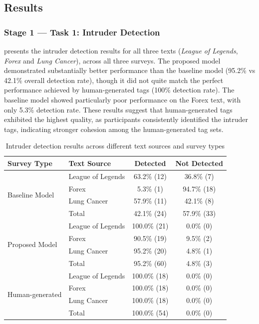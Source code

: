 
\subsection{Results}
\subsubsection{Stage 1 — Task 1: Intruder Detection}
 presents the intruder detection results for all three texts (\textit{League of Legends}, \textit{Forex} and \textit{Lung Cancer}), across all three surveys. The proposed model demonstrated substantially better performance than the baseline model (95.2\% vs 42.1\% overall detection rate), though it did not quite match the perfect performance achieved by human-generated tags (100\% detection rate). The baseline model showed particularly poor performance on the Forex text, with only 5.3\% detection rate. These results suggest that human-generated tags exhibited the highest quality, as participants consistently identified the intruder tags, indicating stronger cohesion among the human-generated tag sets.

\begin{table}[h]
    \centering
    \caption{Intruder detection results across different text sources and survey types}
    \begin{tabular}{llcc}
        \hline
        Survey Type & Text Source & Detected & Not Detected \\
        \hline
        \multirow{4}{*}{Baseline Model} & League of Legends & 63.2\% (12) & 36.8\% (7) \\
        & Forex & 5.3\% (1) & 94.7\% (18) \\
        & Lung Cancer & 57.9\% (11) & 42.1\% (8) \\
        & Total & 42.1\% (24) & 57.9\% (33) \\
        \hline
        \multirow{4}{*}{Proposed Model} & League of Legends & 100.0\% (21) & 0.0\% (0) \\
        & Forex & 90.5\% (19) & 9.5\% (2) \\
        & Lung Cancer & 95.2\% (20) & 4.8\% (1) \\
        & Total & 95.2\% (60) & 4.8\% (3) \\
        \hline
        \multirow{4}{*}{Human-generated} & League of Legends & 100.0\% (18) & 0.0\% (0) \\
        & Forex & 100.0\% (18) & 0.0\% (0) \\
        & Lung Cancer & 100.0\% (18) & 0.0\% (0) \\
        & Total & 100.0\% (54) & 0.0\% (0) \\
        \hline
    \end{tabular}
    \label{tab:intruder_detection}
\end{table}

